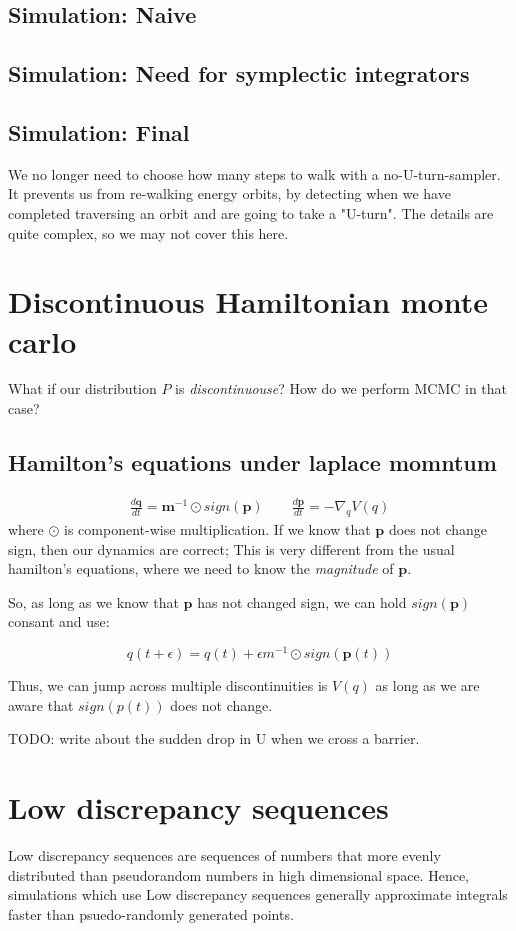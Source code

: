 \documentclass[titlepage]{article}
\newcommand{\p}{\mathbf{p}}
\newcommand{\q}{\mathbf{q}}
\newcommand{\m}{\mathbf{m}}
\begin{document}
\subsection{Simulation: Naive}
\subsection{Simulation: Need for symplectic integrators}
\subsection{Simulation: Final}


We no longer need to choose how many steps to walk with a no-U-turn-sampler.
It prevents us from re-walking energy orbits, by detecting when we have completed
traversing an orbit and are going to take a "U-turn". The details are quite
complex, so we may not cover this here.

\section{Discontinuous Hamiltonian monte carlo}

What if our distribution $P$ is \emph{discontinuouse}? How do we perform MCMC
in that case?

\subsection{Hamilton's equations under laplace momntum}

\begin{align*}
    \frac{d \q}{dt} = \m^{-1} \odot sign(\p) \qquad \frac{d \p}{dt} = - \nabla_q V(q)
\end{align*}
where $\odot$ is component-wise multiplication. If we know that $\p$ does
not change sign, then our dynamics are correct; This is very different from
the usual hamilton's equations, where we need to know the \emph{magnitude}
of $\p$.

So, as long as we know that $\p$ has not changed sign, we can hold $sign(\p)$
consant and use:

$$
q(t + \epsilon) = q(t) + \epsilon m^{-1} \odot sign(\p(t))
$$

Thus, we can jump across multiple discontinuities is $V(q)$ as long as we are
aware that $sign(p(t))$ does not change.

TODO: write about the sudden drop in U when we cross a barrier.

\section{Low discrepancy sequences}
Low discrepancy sequences are sequences of numbers that more evenly
distributed than pseudorandom numbers in high dimensional space. Hence,
simulations which use Low discrepancy sequences generally approximate
integrals faster than psuedo-randomly generated points.
\end{document}
